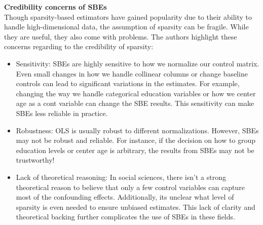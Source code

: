 \textbf{Credibility concerns of SBEs }\\
Though sparsity-based estimators have gained popularity due to their ability to handle high-dimensional data, the assumption of sparsity can be fragile. While they are useful, they also come with problems. The authors highlight these concerns regarding to the credibility of sparsity:
\begin{itemize}
    \item Sensitivity: SBEs are highly sensitive to how we normalize our control matrix. Even small changes in how we handle collinear columns or change baseline controls can lead to significant variations in the estimates. For example, changing the way we handle categorical {education } variables or how we center age as a cont variable can change the SBE results. This sensitivity can make SBEs less reliable in practice.
    \item Robustness: OLS is usually robust to different normalizations. However, SBEs may not be robust and reliable. For instance, if the decision on how to group education levels or center age is arbitrary, the results from SBEs may not be trustworthy!
    \item Lack of theoretical reasoning: In social sciences, there isn't a strong theoretical reason to believe that only a few control variables can capture most of the confounding effects. Additionally, its unclear what level of sparsity is even needed to ensure unbiased estimates. This lack of clarity and theoretical backing further complicates the use of SBEs in these fields.
\end{itemize}






